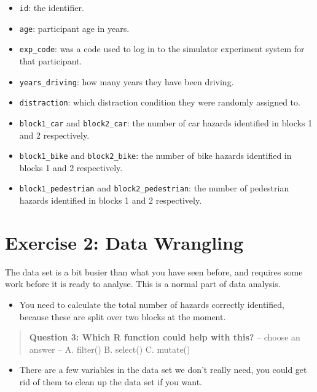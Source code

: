 \documentclass[
]{book}
\providecommand{\tightlist}{%
  \setlength{\itemsep}{0pt}\setlength{\parskip}{0pt}}
\let\oldsection\section
\renewcommand{\section}{\needspace{5\baselineskip}\oldsection}
\begin{document}
\begin{itemize}
\item
  \texttt{id}: the identifier.
\item
  \texttt{age}: participant age in years.
\item
  \texttt{exp\_code}: was a code used to log in to the simulator experiment system for that participant.
\item
  \texttt{years\_driving}: how many years they have been driving.
\item
  \texttt{distraction}: which distraction condition they were randomly assigned to.
\item
  \texttt{block1\_car} and \texttt{block2\_car}: the number of car hazards identified in blocks 1 and 2 respectively.
\item
  \texttt{block1\_bike} and \texttt{block2\_bike}: the number of bike hazards identified in blocks 1 and 2 respectively.
\item
  \texttt{block1\_pedestrian} and \texttt{block2\_pedestrian}: the number of pedestrian hazards identified in blocks 1 and 2 respectively.
\end{itemize}

\section{Exercise 2: Data Wrangling}\label{exercise-2-data-wrangling}

The data set is a bit busier than what you have seen before, and requires some work before it is ready to analyse. This is a normal part of data analysis.

\begin{itemize}
\tightlist
\item
  You need to calculate the total number of hazards correctly identified, because these are split over two blocks at the moment.
\end{itemize}

\begin{quote}
\textbf{Question 3: Which R function could help with this?} -- choose an answer -- A. filter() B. select() C. mutate()
\end{quote}

\begin{itemize}
\tightlist
\item
  There are a few variables in the data set we don't really need, you could get rid of them to clean up the data set if you want.
\end{itemize}
\end{document}
